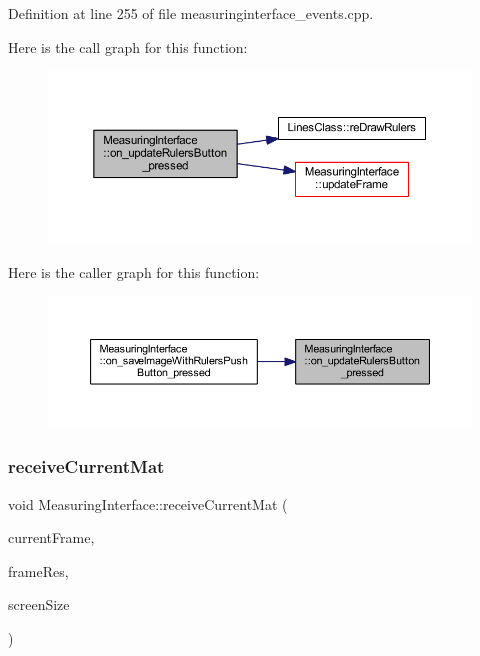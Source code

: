 Definition at line 255 of file measuringinterface\+\_\+events.\+cpp.

Here is the call graph for this function\+:
\nopagebreak
\begin{figure}[H]
\begin{center}
\leavevmode
\includegraphics[width=350pt]{classMeasuringInterface_a18a63bf732f8df1ed9b94450b19ef455_cgraph}
\end{center}
\end{figure}
Here is the caller graph for this function\+:
\nopagebreak
\begin{figure}[H]
\begin{center}
\leavevmode
\includegraphics[width=350pt]{classMeasuringInterface_a18a63bf732f8df1ed9b94450b19ef455_icgraph}
\end{center}
\end{figure}
\mbox{\label{classMeasuringInterface_a776a6aa345a738ee46e84c272fd35ce7}} 
\subsubsection{\texorpdfstring{receiveCurrentMat}{receiveCurrentMat}}
{\footnotesize\ttfamily void Measuring\+Interface\+::receive\+Current\+Mat (\begin{DoxyParamCaption}\item[{Mat}]{current\+Frame,  }\item[{Q\+Size}]{frame\+Res,  }\item[{Q\+Rect}]{screen\+Size }\end{DoxyParamCaption})\hspace{0.3cm}{\ttfamily [slot]}}



